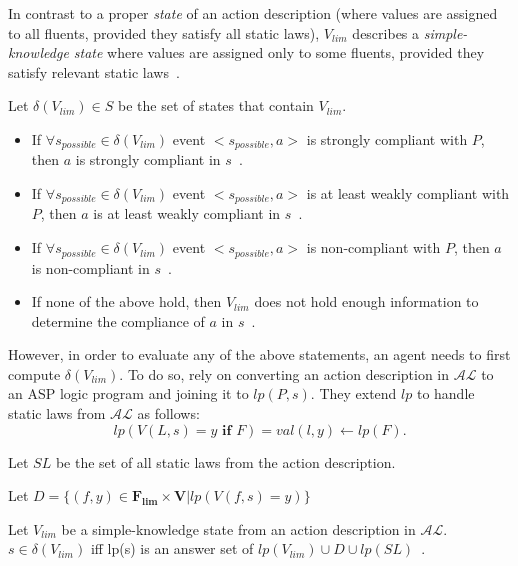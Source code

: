 \begin{definition}
    \label{def:simple_knowledge_state}
    In contrast to a proper \textit{state} of an action description (where values are assigned to all fluents, provided they satisfy all static laws), $V_{lim}$ describes a \textit{simple-knowledge state} where values are assigned only to some fluents, provided they satisfy relevant static laws~\citep{gelfond_authorization_2008}.
\end{definition}

\begin{definition}
    Let $\delta(V_{lim}) \in S$ be the set of states that contain $V_{lim}$.

    \begin{itemize}
        \item If $\forall s_{possible} \in \delta(V_{lim})$ event $<s_{possible}, a>$ is strongly compliant with $P$, then $a$ is strongly compliant in $s$~\citep{gelfond_authorization_2008}.
        \item If $\forall s_{possible} \in \delta(V_{lim})$ event $<s_{possible}, a>$ is at least weakly compliant with $P$, then $a$ is at least weakly compliant in $s$~\citep{gelfond_authorization_2008}.
        \item If $\forall s_{possible} \in \delta(V_{lim})$ event $<s_{possible}, a>$ is non-compliant with $P$, then $a$ is non-compliant in $s$~\citep{gelfond_authorization_2008}.
        \item If none of the above hold, then $V_{lim}$ does not hold enough information to determine the compliance of $a$ in $s$~\citep{gelfond_authorization_2008}.
    \end{itemize}
\end{definition}

However, in order to evaluate any of the above statements, an agent needs to first compute $\delta(V_{lim})$.
To do so, \citet{gelfond_authorization_2008} rely on converting an action description in $\mathcal{AL}$ to an ASP logic program and joining it to $lp(P, s)$.
They extend $lp$ to handle static laws from $\mathcal{AL}$ as follows:
\[
lp(V(L,s)=y \textbf{ if } F) = val(l, y) \leftarrow lp(F).
\]

Let $SL$ be the set of all static laws from the action description.

Let $D = \{ (f,y) \in \boldsymbol{F_{lim}} \times \boldsymbol{V} | lp(V(f,s)=y)\}$

\begin{definition}
    Let $V_{lim}$ be a simple-knowledge state from an action description in $\mathcal{AL}$.
    $s \in \delta(V_{lim})$ iff lp(s) is an answer set of $lp(V_{lim}) \cup D \cup lp(SL)$~\citep{gelfond_authorization_2008}.
\end{definition}

